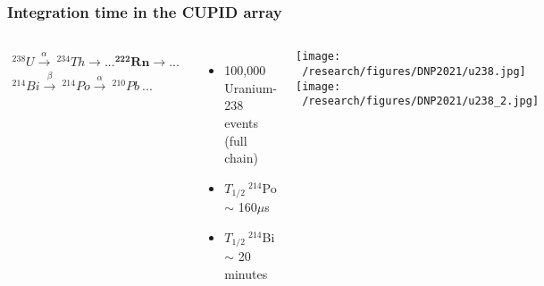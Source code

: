 \documentclass{beamer}
\begin{document}

	\begin{frame}
		\frametitle{Integration time in the CUPID array}
		\begin{columns}[c] %
			
			\begin{eqnarray*}
			^{238}U \xrightarrow{\alpha} \  ^{234}Th \xrightarrow \  ... \boldsymbol{^{222}Rn} \xrightarrow \ ... \\ ^{214}Bi \xrightarrow{\beta} \  ^{214}Po \xrightarrow{\alpha} \ ^{210}Pb \ ...
			\end{eqnarray*}
			\begin{itemize}
				\setlength\itemsep{2em}
				\item 100,000 Uranium-238 events (full chain)
				\item $T_{1/2} \ ^{214}$Po $\sim$ 160$\mu$s
				\item $T_{1/2} \ ^{214}$Bi $\sim$ 20 minutes
			\end{itemize}
			
			\hspace*{0.3cm}\texttt{[image: ~/research/figures/DNP2021/u238.jpg]}
			\medskip\medskip
			\hspace*{0.3cm}\texttt{[image: ~/research/figures/DNP2021/u238\_2.jpg]}
			
		\end{columns}
	\end{frame}

\end{document}
